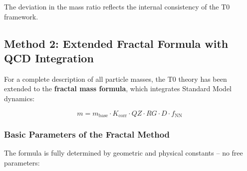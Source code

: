 	The deviation in the mass ratio reflects the internal consistency of the T0 framework.

	\subsection{Method 2: Extended Fractal Formula with QCD Integration}
	
	For a complete description of all particle masses, the T0 theory has been extended to the \textbf{fractal mass formula}, which integrates Standard Model dynamics:
	
	\begin{equation}
		\boxed{m = m_{\text{base}} \cdot K_{\text{corr}} \cdot QZ \cdot RG \cdot D \cdot f_{\text{NN}}}
		\label{eq:t0_fractal_mass}
	\end{equation}
	
	\subsubsection{Basic Parameters of the Fractal Method}
	
	The formula is fully determined by geometric and physical constants -- no free parameters:
	
	\begin{table}[h]
		\centering
		\small
		\caption{Parameters of the extended fractal T0 formula}
		\label{tab:fractal_params}
	\end{table}
	
